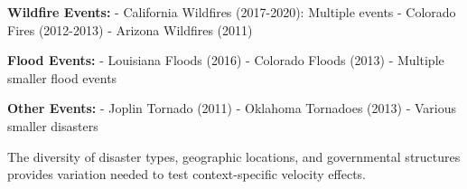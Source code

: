 \documentclass[
  12pt,
  letterpaper,
]{article}
\begin{document}
\textbf{Wildfire Events:} - California Wildfires (2017-2020): Multiple
events - Colorado Fires (2012-2013) - Arizona Wildfires (2011)

\textbf{Flood Events:} - Louisiana Floods (2016) - Colorado Floods
(2013) - Multiple smaller flood events

\textbf{Other Events:} - Joplin Tornado (2011) - Oklahoma Tornadoes
(2013) - Various smaller disasters

The diversity of disaster types, geographic locations, and governmental
structures provides variation needed to test context-specific velocity
effects.
\end{document}
